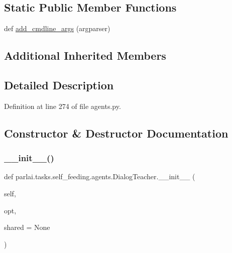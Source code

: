 \subsection*{Static Public Member Functions}
\begin{DoxyCompactItemize}
\item 
def \hyperlink{classparlai_1_1tasks_1_1self__feeding_1_1agents_1_1DialogTeacher_a69b92c60fafef817217b21de44379117}{add\+\_\+cmdline\+\_\+args} (argparser)
\end{DoxyCompactItemize}
\subsection*{Additional Inherited Members}


\subsection{Detailed Description}


Definition at line 274 of file agents.\+py.



\subsection{Constructor \& Destructor Documentation}
\mbox{\label{classparlai_1_1tasks_1_1self__feeding_1_1agents_1_1DialogTeacher_a4d54bccea69db40c88a1a9c83b0bad78}} 
\subsubsection{\texorpdfstring{\+\_\+\+\_\+init\+\_\+\+\_\+()}{\_\_init\_\_()}}
{\footnotesize\ttfamily def parlai.\+tasks.\+self\+\_\+feeding.\+agents.\+Dialog\+Teacher.\+\_\+\+\_\+init\+\_\+\+\_\+ (\begin{DoxyParamCaption}\item[{}]{self,  }\item[{}]{opt,  }\item[{}]{shared = {\ttfamily None} }\end{DoxyParamCaption})}



